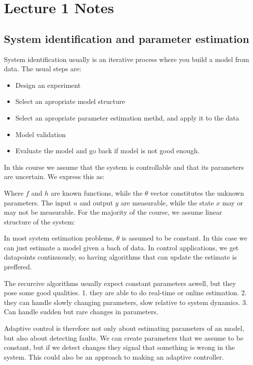 \section*{Lecture 1 Notes}

\subsection*{System identification and parameter estimation}

System identification usually is an iterative process where you build a model from data. 
The usual steps are: 
\begin{itemize}
    \item Design an experiment
    \item Select an apropriate model structure
    \item Select an apropriate parameter estimation methd, and apply it to the data
    \item Model validation
    \item Evaluate the model and go back if model is not good enough. 
\end{itemize}

In this course we assume that the system is controllable and that its parameters are uncertain. 
We express this as: \\

\nonlinsys

Where $f$ and $h$ are known functions, while the $\theta$ vector constitutes the unknown parameters. 
The input $u$ and output $y$ are measurable, while the state $x$ may or may not be measurable.
For the majority of the course, we assume linear structure of the system: \\
\linsys

In most system estimation problems, $\theta$ is assumed to be constant. In this case we 
can just estimate a model given a bach of data. In control applications, we get datapoints continuously,
so having algorithms that can update the estimate is preffered. 

The recurcive algorithms usually expect constant parameters aswell, but they pose some good qualities. 
1. they are able to do real-time or online estimation. 2. they can handle slowly changing parameters, slow relative to system dynamics. 3. Can handle sudden but rare changes in parameters. 

Adaptive control is therefore not only about estimating parameters of an model, but also about detecting faults.
We can create parameters that we assume to be constant, but if we detect changes they signal that something is wrong in the system. 
This could also be an approach to making an adaptive controller. 

